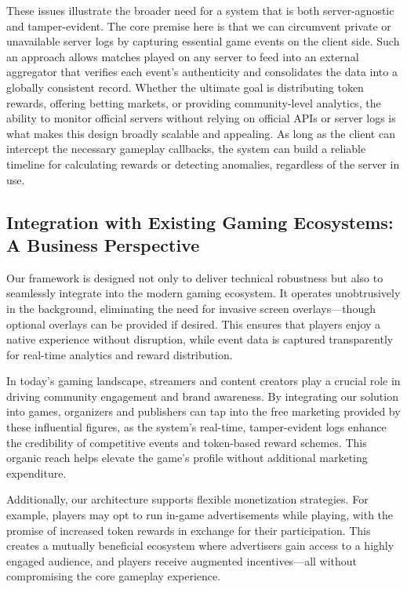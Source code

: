 \documentclass[11pt]{article}
\begin{document}
These issues illustrate the broader need for a system that is both server-agnostic and tamper-evident. The core premise here is that we can circumvent private or unavailable server logs by capturing essential game events on the client side. Such an approach allows matches played on any server to feed into an external aggregator that verifies each event’s authenticity and consolidates the data into a globally consistent record. Whether the ultimate goal is distributing token rewards, offering betting markets, or providing community-level analytics, the ability to monitor official servers without relying on official APIs or server logs is what makes this design broadly scalable and appealing. As long as the client can intercept the necessary gameplay callbacks, the system can build a reliable timeline for calculating rewards or detecting anomalies, regardless of the server in use.

\subsection{Integration with Existing Gaming Ecosystems: A Business Perspective}
\label{sec:integration-business}

Our framework is designed not only to deliver technical robustness but also to seamlessly integrate into the modern gaming ecosystem. It operates unobtrusively in the background, eliminating the need for invasive screen overlays—though optional overlays can be provided if desired. This ensures that players enjoy a native experience without disruption, while event data is captured transparently for real-time analytics and reward distribution.

In today’s gaming landscape, streamers and content creators play a crucial role in driving community engagement and brand awareness. By integrating our solution into games, organizers and publishers can tap into the free marketing provided by these influential figures, as the system’s real-time, tamper-evident logs enhance the credibility of competitive events and token-based reward schemes. This organic reach helps elevate the game's profile without additional marketing expenditure.

Additionally, our architecture supports flexible monetization strategies. For example, players may opt to run in-game advertisements while playing, with the promise of increased token rewards in exchange for their participation. This creates a mutually beneficial ecosystem where advertisers gain access to a highly engaged audience, and players receive augmented incentives—all without compromising the core gameplay experience.
\end{document}
